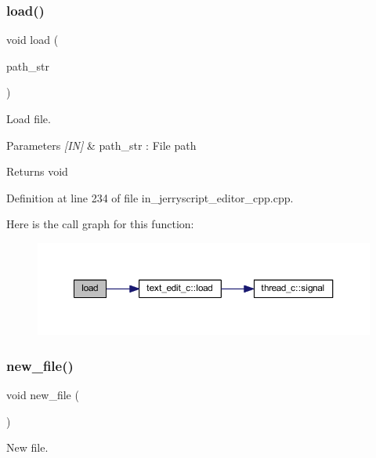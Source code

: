 \subsubsection{load()\hspace{0.1cm}{\footnotesize\ttfamily [2/2]}}
{\footnotesize\ttfamily void load (\begin{DoxyParamCaption}\item[{wx\+String}]{path\+\_\+str }\end{DoxyParamCaption})}



Load file. 


\begin{DoxyParams}{Parameters}
{\em \mbox{[}\+I\+N\mbox{]}} & path\+\_\+str \+: File path \\
\hline
\end{DoxyParams}
\begin{DoxyReturn}{Returns}
void 
\end{DoxyReturn}


Definition at line 234 of file in\+\_\+jerryscript\+\_\+editor\+\_\+cpp.\+cpp.

Here is the call graph for this function\+:
\nopagebreak
\begin{figure}[H]
\begin{center}
\leavevmode
\includegraphics[width=350pt]{group___editor_ga8caf41718ffb5bf060de703f18f72546_cgraph}
\end{center}
\end{figure}
\mbox{\label{group___editor_ga24e4d4948e63a16f025b4d2c19546ca0}} 
\subsubsection{new\_file()}
{\footnotesize\ttfamily void new\+\_\+file (\begin{DoxyParamCaption}\item[{void}]{ }\end{DoxyParamCaption})}



New file. 


